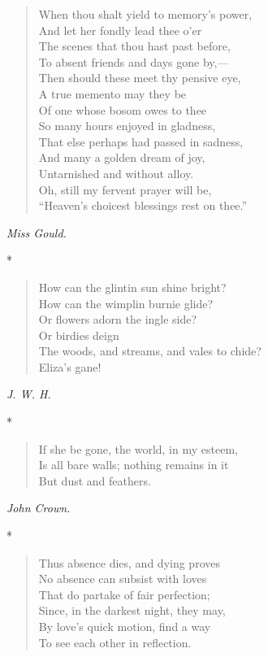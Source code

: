 \documentclass[11pt,twoside]{article}
\newcommand\stars{\begin{center}*\quad*\quad*\end{center}}
\newcommand\by[1]{\par\hfill\textit{#1}\par}
\begin{document}
\begin{verse}
When thou shalt yield to memory’s power,\\
And let her fondly lead thee o’er\\
The scenes that thou hast past before,\\
To absent friends and days gone by,---\\
Then should these meet thy pensive eye,\\
A true memento may they be\\
Of one whose bosom owes to thee\\
So many hours enjoyed in gladness,\\
That else perhaps had passed in sadness,\\
And many a golden dream of joy,\\
Untarnished and without alloy.\\
Oh, still my fervent prayer will be,\\
“Heaven’s choicest blessings rest on thee.”
\end{verse}

\by{Miss Gould.}

\stars

\begin{verse}
How can the glintin sun shine bright?\\
How can the wimplin burnie glide?\\
Or flowers adorn the ingle side?\\
\quad Or birdies deign\\
The woods, and streams, and vales to chide?\\
\quad Eliza’s gane!
\end{verse}

\by{J. W. H.}

\stars

\begin{verse}
If she be gone, the world, in my esteem,\\
Is all bare walls; nothing remains in it\\
But dust and feathers.
\end{verse}

\by{John Crown.}

\stars

\begin{verse}
Thus absence dies, and dying proves\\
No absence can subsist with loves\\
\quad That do partake of fair perfection;\\
Since, in the darkest night, they may,\\
By love’s quick motion, find a way\\
\quad To see each other in reflection.
\end{verse}
\end{document}
